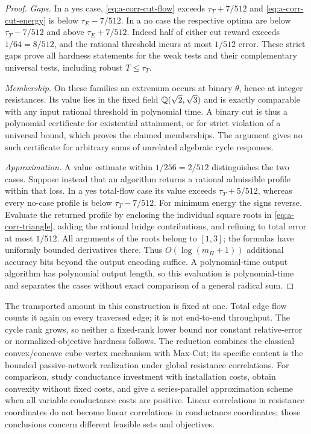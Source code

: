 \begin{proof}
\emph{Gaps.} In a yes case, \cref{eq:a-corr-cut-flow} exceeds $\tau_T+7/512$ and
\cref{eq:a-corr-cut-energy} is below $\tau_E-7/512$. In a no case the
respective optima are below $\tau_T-7/512$ and above $\tau_E+7/512$.
Indeed half of either cut reward exceeds $1/64=8/512$, and the rational
threshold incurs at most $1/512$ error. These strict gaps prove all
hardness statements for the weak tests and their complementary universal
tests, including robust $T\le\tau_T$.

\emph{Membership.} On these families an extremum occurs at binary
$\theta$, hence at integer resistances. Its value lies in the fixed
field $\mathbb{Q}(\sqrt2,\sqrt3)$ and is exactly comparable with any input
rational threshold in polynomial time. A binary cut is thus a polynomial
certificate for existential attainment, or for strict violation of a
universal bound, which proves the claimed memberships. The argument
gives no such certificate for arbitrary sums of unrelated algebraic
cycle responses.

\emph{Approximation.} A value estimate within $1/256=2/512$ distinguishes the two cases.
Suppose instead that an algorithm returns a rational admissible profile
within that loss. In a yes total-flow case its value exceeds
$\tau_T+5/512$, whereas every no-case profile is below
$\tau_T-7/512$. For minimum energy the signs reverse. Evaluate the
returned profile by enclosing the individual square roots in
\cref{eq:a-corr-triangle}, adding the rational bridge contributions,
and refining to total error at most $1/512$. All arguments of the roots
belong to $[1,3]$; the formulas have uniformly bounded derivatives there.
Thus $O(\log(m_H+1))$ additional accuracy bits beyond the output encoding
suffice. A polynomial-time output algorithm has polynomial output
length, so this evaluation is polynomial-time and separates the cases
without exact comparison of a general radical sum.
\end{proof}

The transported amount in this construction is fixed at one. Total edge
flow counts it again on every traversed edge; it is not end-to-end
throughput. The cycle rank grows, so neither a fixed-rank lower bound nor
constant relative-error or normalized-objective hardness follows.
The reduction combines the classical convex/concave cube-vertex mechanism
with Max-Cut; its specific content is the bounded passive-network
realization under global resistance correlations. For comparison,
\citet[Corollary 4 and Theorem 11]{klimm2026-approximating-the-network-design-problem}
study conductance investment with installation costs, obtain convexity
without fixed costs, and give a series-parallel approximation scheme when
all variable conductance costs are positive. Linear correlations in
resistance coordinates do not become linear correlations in conductance
coordinates; those conclusions concern different feasible sets and
objectives.

